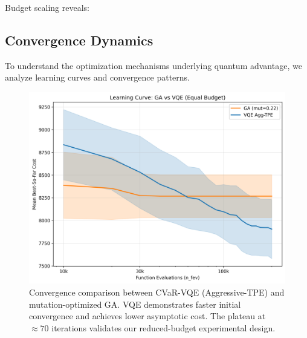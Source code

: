 Budget scaling reveals:

\subsection{Convergence Dynamics}

To understand the optimization mechanisms underlying quantum advantage, we analyze learning curves and convergence patterns.


\begin{figure}[htb]
    \centering
    \includegraphics[width=0.8\linewidth]{figures/02_ga_vs_vqe_learning_curve.png}
    \caption{Convergence comparison between CVaR-VQE (Aggressive-TPE) and mutation-optimized GA. VQE demonstrates faster initial convergence and achieves lower asymptotic cost. The plateau at $\approx 70$ iterations validates our reduced-budget experimental design.}
    \label{fig:learning_curves}
\end{figure}

